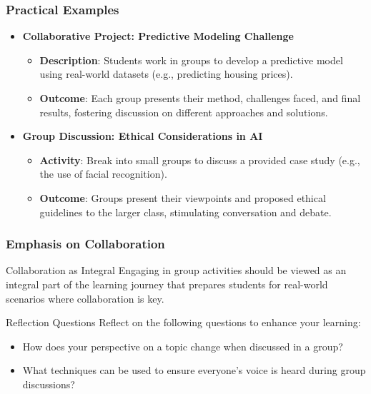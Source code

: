 \documentclass[aspectratio=169]{beamer}
\begin{document}
\begin{frame}[fragile]
    \frametitle{Practical Examples}
    \begin{itemize}
        \item \textbf{Collaborative Project: Predictive Modeling Challenge}
        \begin{itemize}
            \item \textbf{Description}: Students work in groups to develop a predictive model using real-world datasets (e.g., predicting housing prices).
            \item \textbf{Outcome}: Each group presents their method, challenges faced, and final results, fostering discussion on different approaches and solutions.
        \end{itemize}

        \item \textbf{Group Discussion: Ethical Considerations in AI}
        \begin{itemize}
            \item \textbf{Activity}: Break into small groups to discuss a provided case study (e.g., the use of facial recognition).
            \item \textbf{Outcome}: Groups present their viewpoints and proposed ethical guidelines to the larger class, stimulating conversation and debate.
        \end{itemize}
    \end{itemize}
\end{frame}

\begin{frame}[fragile]
    \frametitle{Emphasis on Collaboration}
    \begin{block}{Collaboration as Integral}
        Engaging in group activities should be viewed as an integral part of the learning journey that prepares students for real-world scenarios where collaboration is key.
    \end{block}

    \begin{block}{Reflection Questions}
        Reflect on the following questions to enhance your learning:
        \begin{itemize}
            \item How does your perspective on a topic change when discussed in a group?
            \item What techniques can be used to ensure everyone's voice is heard during group discussions?
        \end{itemize}
    \end{block}
\end{frame}
\end{document}
